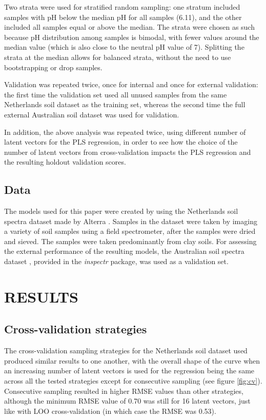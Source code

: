 \documentclass{isprs}
\begin{document}
Two strata were used for stratified random sampling: one stratum included samples with pH below the median pH for all samples (6.11), and the other included all samples equal or above the median. The strata were chosen as such because pH distribution among samples is bimodal, with fewer values around the median value (which is also close to the neutral pH value of 7). Splitting the strata at the median allows for balanced strata, without the need to use bootstrapping or drop samples.

Validation was repeated twice, once for internal and once for external validation: the first time the validation set used all unused samples from the same Netherlands soil dataset as the training set, whereas the second time the full external Australian soil dataset was used for validation.

In addition, the above analysis was repeated twice, using different number of latent vectors for the PLS regression, in order to see how the choice of the number of latent vectors from cross-validation impacts the PLS regression and the resulting holdout validation scores.

\subsection{Data}\label{sec:Data}

The models used for this paper were created by using the Netherlands soil spectra dataset made by Alterra \cite{groenestijn2009}. Samples in the dataset were taken by imaging a variety of soil samples using a field spectrometer, after the samples were dried and sieved. The samples were taken predominantly from clay soils. For assessing the external performance of the resulting models, the Australian soil spectra dataset \cite{rossel2010using}, provided in the \textit{inspectr} package, was used as a validation set.

\section{RESULTS}\label{sec:RESULTS}

\subsection{Cross-validation strategies}\label{sec:Cross-validation strategies 2}

The cross-validation sampling strategies for the Netherlands soil dataset used produced similar results to one another, with the overall shape of the curve when an increasing number of latent vectors is used for the regression being the same across all the tested strategies except for consecutive sampling (see figure \ref{fig:cv}). Consecutive sampling resulted in higher RMSE values than other strategies, although the minimum RMSE value of 0.70 was still for 16 latent vectors, just like with LOO cross-validation (in which case the RMSE was 0.53).
\end{document}
